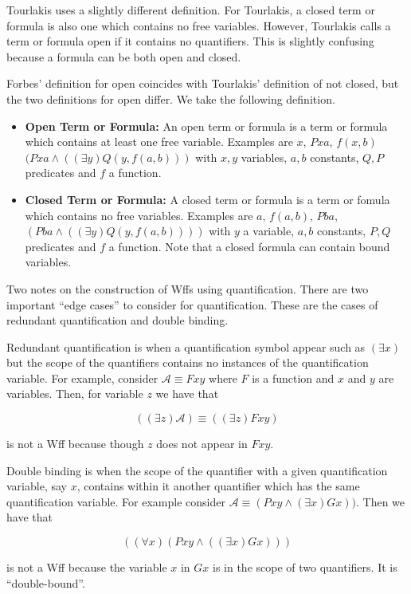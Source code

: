 \documentclass[12pt]{article}
\newcommand{\mc}[1]{\mathcal{#1}}
\begin{document}
Tourlakis uses a slightly different definition. For Tourlakis, a closed term or formula is also one which contains no free variables. However, Tourlakis calls a term or formula open if it contains no quantifiers. This is slightly confusing because a formula can be both open and closed. 

Forbes' definition for open coincides with Tourlakis' definition of not closed, but the two definitions for open differ. We take the following definition.

\hrulefill
\begin{itemize}
\item{\textbf{Open Term or Formula:} An open term or formula is a term or formula which contains at least one free variable. Examples are $x$, $Pxa$, $f(x,b)$ $(Pxa \land ((\exists y) Q(y,f(a,b)))$ with $x,y$ variables, $a,b$ constants, $Q,P$ predicates and $f$ a function.}
\item{\textbf{Closed Term or Formula:} A closed term or formula is a term or fomula which contains no free variables. Examples are $a$, $f(a,b)$, $Pba$, $(Pba \land ((\exists y)Q(y,f(a,b))))$ with $y$ a variable, $a,b$ constants, $P,Q$ predicates and $f$ a function. Note that a closed formula can contain bound variables.}
\end{itemize}
\hrulefill

Two notes on the construction of Wffs using quantification. There are two important ``edge cases'' to consider for quantification. These are the cases of redundant quantification and double binding.

Redundant quantification is when a quantification symbol appear such as $(\exists x)$ but the scope of the quantifiers contains no instances of the quantification variable. For example, consider $\mc{A} \equiv Fxy$ where $F$ is a function and $x$ and $y$ are variables. Then, for variable $z$ we have that

$$
((\exists z)\mc{A}) \equiv ((\exists z)Fxy)
$$

is not a Wff because though $z$ does not appear in $Fxy$.

Double binding is when the scope of the quantifier with a given quantification variable, say $x$, contains within it another quantifier which has the same quantification variable. For example consider $\mc{A} \equiv (Pxy \land (\exists x)Gx))$. Then we have that

$$
((\forall x)(Pxy \land ((\exists x)Gx)))
$$

is not a Wff because the variable $x$ in $Gx$ is in the scope of two quantifiers. It is ``double-bound''.
\end{document}
